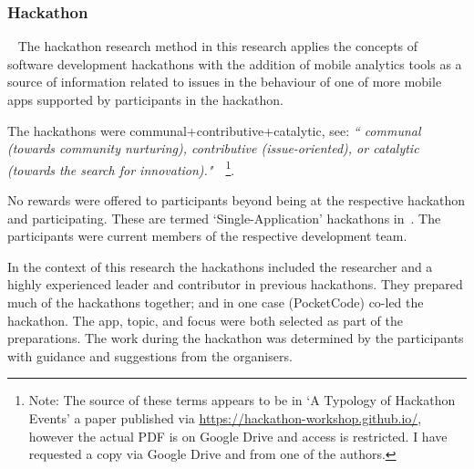 %
%


\subsubsection{Hackathon}~\label{section-hackathon-research-method}
The hackathon research method in this research applies the concepts of software development hackathons with the addition of mobile analytics tools as a source of information related to issues in the behaviour of one of more mobile apps supported by participants in the hackathon.

The hackathons were communal+contributive+catalytic, see: \emph{`` communal (towards  community  nurturing), contributive  (issue-oriented),  or  catalytic  (towards  the search  for  innovation)."}~\citep[p.3]{medina2020_what_do_we_know_about_hackathons_etc_a_SLR}~\footnote{Note: The source of these terms appears to be in `A Typology of Hackathon Events' a paper published via \url{https://hackathon-workshop.github.io/}, however the actual PDF is on Google Drive and access is restricted. I have requested a copy via Google Drive and from one of the authors.}.

No rewards were offered to participants beyond being at the respective hackathon and participating. These are termed `Single-Application' hackathons in~\citealt[p.5]{briscoe2014_digital_innovation_the_hackathon_phenomenon}. The participants were current members of the respective development team.

In the context of this research the hackathons included the researcher and a highly experienced leader and contributor in previous hackathons. They prepared much of the hackathons together; and in one case (PocketCode) co-led the hackathon. The app, topic, and focus were both selected as part of the preparations. The work during the hackathon was determined by the participants with guidance and suggestions from the organisers.



